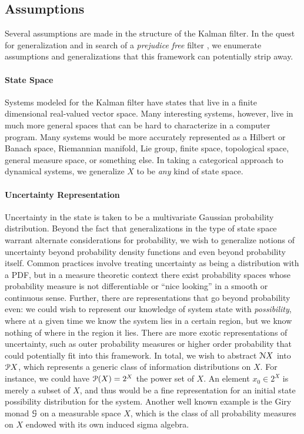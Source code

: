 \subsection{Assumptions}

Several assumptions are made in the structure of the Kalman filter. In the quest for generalization and in search of a \emph{prejudice free} filter \cite{some-moriba-paper}, we enumerate assumptions and generalizations that this framework can potentially strip away.

\paragraph{State Space}

Systems modeled for the Kalman filter have states that live in a finite dimensional real-valued vector space. Many interesting systems, however, live in much more general spaces that can be hard to characterize in a computer program.  Many systems would be more accurately represented as a Hilbert or Banach space, Riemannian manifold, Lie group, finite space, topological space, general measure space, or something else. In taking a categorical approach to dynamical systems, we generalize $X$ to be \emph{any} kind of state space.

\paragraph{Uncertainty Representation}

Uncertainty in the state is taken to be a multivariate Gaussian probability distribution. Beyond the fact that generalizations in the type of state space warrant alternate considerations for probability, we wish to generalize notions of uncertainty beyond probability density functions and even beyond probability itself. Common practices involve treating uncertainty as being a distribution with a PDF, but in a measure theoretic context there exist probability spaces whose probability measure is not differentiable or ``nice looking'' in a smooth or continuous sense. Further, there are representations that go beyond probability even: we could wish to represent our knowledge of system state with \emph{possibility}, where at a given time we know the system lies in a certain region, but we know nothing of where in the region it lies. There are more exotic representations of uncertainty, such as outer probability measures \cite{houssineau} or higher order probability \cite{some moriba paper} that could potentially fit into this framework. In total, we wish to abstract $\mathcal{N} X$ into $\mathcal{P} X$, which represents a generic class of information distributions on $X$. For instance, we could have $\mathcal{P}(X) = 2^X$ the power set of $X$. An element $x_0\in 2^X$ is merely a subset of $X$, and thus would be a fine representation for an initial state possibility distribution for the system. Another well known example is the Giry monad $\mathcal{G}$ on a measurable space $X$, which is the class of all probability measures on $X$ endowed with its own induced sigma algebra.

